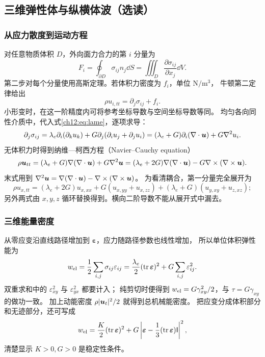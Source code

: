 \subsection{三维弹性体与纵横体波（选读）}

\subsubsection{从应力散度到运动方程}

对任意物质体积 $D$，外向面力合力的第 $i$ 分量为
\[
 F_i=\oint_{\partial D}\sigma_{ij}n_j\dd S
 =\iiint_D\frac{\partial\sigma_{ij}}{\partial x_j}\dd V.
\]
第二步对每个分量使用高斯定理。若体积力密度为 $f_i$，单位 $\mathrm{N/m^3}$，
牛顿第二定律给出
\begin{equation}
 \rho u_{i,tt}=\partial_j\sigma_{ij}+f_i.
 \label{ch12:eq:stress-div}
\end{equation}
小形变时，在这一阶精度内可将参考坐标导数与空间坐标导数等同。
均匀各向同性介质中，代入式\eqref{ch12:eq:lame}，逐项求导：
\[
 \partial_j\sigma_{ij}
 =\lambda_e\partial_i(\partial_k u_k)
   +G\partial_j(\partial_i u_j+\partial_j u_i)
 =(\lambda_e+G)\partial_i(\nabla\cdot\bm{u})+G\nabla^2u_i.
\]
无体积力时得到纳维—柯西方程（Navier--Cauchy equation）
\begin{equation}
 \rho\vect u_{tt}=(\lambda_e+G)\nabla(\nabla\cdot\vect u)+G\nabla^2\vect u
 =(\lambda_e+2G)\nabla(\nabla\cdot\vect u)-G\nabla\times(\nabla\times\vect u).
 \label{ch12:eq:navier}
\end{equation}
末式用到 $\nabla^2\bm{u}=\nabla(\nabla\cdot\bm{u})-\nabla\times(\nabla\times\bm{u})$。
为看清耦合，第一分量完全展开为
\[
 \rho u_{x,tt}=(\lambda_e+2G)u_{x,xx}
 +G(u_{x,yy}+u_{x,zz})
 +(\lambda_e+G)(u_{y,xy}+u_{z,xz});
\]
另外两式由 $x,y,z$ 循环替换得到。横向二阶导数不能从展开式中漏去。

\subsubsection{三维能量密度}

从零应变沿直线路径增加到 $\boldsymbol\varepsilon$，应力随路径参数也线性增加，
所以单位体积弹性能为
\begin{equation}
 w_{\rm el}=\frac12\sum_{i,j}\sigma_{ij}\varepsilon_{ij}
 =\frac{\lambda_e}{2}(\operatorname{tr}\boldsymbol\varepsilon)^2
   +G\sum_{i,j}\varepsilon_{ij}^2.
 \label{ch12:eq:elastic-energy}
\end{equation}
双重求和中的 $\varepsilon_{xy}^2$ 与 $\varepsilon_{yx}^2$ 都要计入；
纯剪切时便得到 $w_{\rm el}=G\gamma_{xy}^2/2$，与 $\tau=G\gamma_{xy}$ 的做功一致。
加上动能密度 $\rho|\bm{u}_t|^2/2$ 就得到总机械能密度。
把应变分成体积部分和无迹部分，还可写成
\[
 w_{\rm el}=\frac K2(\operatorname{tr}\boldsymbol\varepsilon)^2
 +G\left|\boldsymbol\varepsilon-\frac13
 (\operatorname{tr}\boldsymbol\varepsilon)\mathsf I\right|^2,
\]
清楚显示 $K>0,G>0$ 是稳定性条件。

